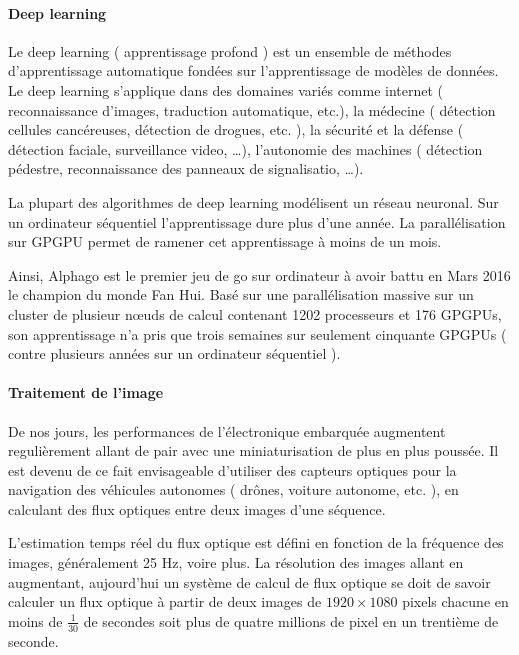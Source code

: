 \documentclass[fleqn,11pt]{article}
\begin{document}
\paragraph{Deep learning}

Le deep learning ( apprentissage profond ) est un ensemble de méthodes d'apprentissage automatique fondées sur l'apprentissage de modèles de données. Le deep learning s'applique dans des domaines variés  comme internet ( reconnaissance d'images, traduction automatique, etc.), la médecine  ( détection cellules cancéreuses, détection de drogues, etc. ), la sécurité et la défense  ( détection faciale, surveillance video, \ldots ), l'autonomie des machines ( détection pédestre,  reconnaissance des panneaux de signalisatio, \ldots ).

La plupart des algorithmes de deep learning modélisent un réseau neuronal. Sur un ordinateur séquentiel l'apprentissage dure plus d'une année. La parallélisation sur GPGPU permet de ramener cet apprentissage  à moins de un mois.

Ainsi, Alphago est le premier jeu de go sur ordinateur à avoir battu en Mars 2016 le champion du monde Fan Hui. Basé sur une parallélisation massive sur un cluster de plusieur nœuds de calcul contenant 1202 processeurs et 176 GPGPUs, son apprentissage n'a pris que trois semaines sur seulement cinquante GPGPUs ( contre plusieurs années sur un ordinateur séquentiel ).



\paragraph{Traitement de l'image}

De nos jours, les performances de l'électronique embarquée augmentent regulièrement allant de pair avec une miniaturisation de plus en plus poussée. Il est devenu de ce fait envisageable d'utiliser des capteurs optiques pour la navigation des véhicules autonomes  ( drônes, voiture autonome, etc. ), en calculant des flux optiques entre deux images d'une séquence. 

L'estimation temps réel du flux optique est défini en fonction de la fréquence des images, généralement 25 Hz, voire plus. La résolution des images allant en augmentant, aujourd'hui un système de calcul de flux optique se doit de savoir calculer un flux optique à partir de deux images de $1920\times 1080$ pixels chacune en moins de $\frac{1}{30}$ de secondes soit plus de quatre millions de pixel en un trentième de seconde.
\end{document}
